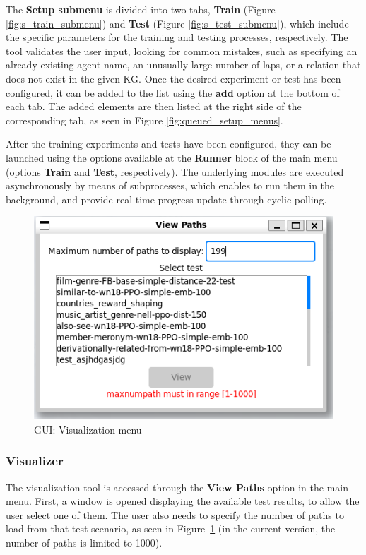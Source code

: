 The \textbf{Setup submenu} is divided into two tabs, \textbf{Train} (Figure \ref{fig:s_train_submenu}) and \textbf{Test} (Figure \ref{fig:s_test_submenu}), which include the specific parameters for the training and testing processes, respectively. The tool validates the user input, looking for common mistakes, such as specifying an already existing agent name, an unusually large number of laps, or a relation that does not exist in the given KG. Once the desired experiment or test has been configured, it can be added to the list using the \textbf{add} option at the bottom of each tab. The added elements are then listed at the right side of the corresponding tab, as seen in Figure \ref{fig:queued_setup_menus}.

After the training experiments and tests have been configured, they can be launched using the options available at the \textbf{Runner} block of the main menu (options \textbf{Train} and \textbf{Test}, respectively). The underlying modules are executed asynchronously by means of subprocesses, which enables \toolname{} to run them in the background, and provide real-time progress update through cyclic polling.

\begin{figure}[!h]
    \centering
    \includegraphics[width=0.47\columnwidth]{fig/framework/GUI/view_paths_menu_error}
    \caption{\toolname{} GUI: Visualization menu}
    \label{fig:view_paths_menu}
\end{figure}

\subsubsection{Visualizer}
The visualization tool is accessed through the \textbf{View Paths} option in the main menu. First, a window is opened displaying the available test results, to allow the user select one of them. The user also needs to specify the number of paths to load from that test scenario, as seen in Figure~\ref{fig:view_paths_menu} (in the current version, the number of paths is limited to 1000).

